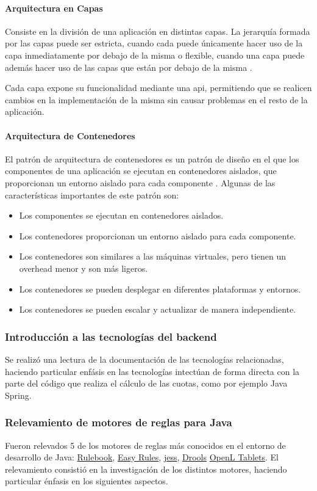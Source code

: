 \paragraph{Arquitectura en Capas}
Consiste en la división de una aplicación en distintas capas. La jerarquía formada por las capas puede ser estricta, cuando cada puede únicamente hacer uso de la capa inmediatamente por debajo de la misma o flexible, cuando una capa puede además hacer uso de las capas que están por debajo de la misma \cite{gommaModeling}.

Cada capa expone su funcionalidad mediante una \acrshort{api}, permitiendo que se realicen cambios en la implementación de la misma sin causar problemas en el resto de la aplicación.

\paragraph{Arquitectura de Contenedores}
El patrón de arquitectura de contenedores es un patrón de diseño en el que los componentes de una aplicación se ejecutan en contenedores aislados, que proporcionan un entorno aislado para cada componente \cite{dockerUpRunning}. Algunas de las características importantes de este patrón son:
\begin{itemize}
    \item Los componentes se ejecutan en contenedores aislados.
    \item Los contenedores proporcionan un entorno aislado para cada
componente.
    \item Los contenedores son similares a las máquinas virtuales, pero tienen
un overhead menor y son más ligeros.
    \item Los contenedores se pueden desplegar en diferentes plataformas y
entornos.
    \item Los contenedores se pueden escalar y actualizar de manera
independiente.
\end{itemize}

\subsubsection{Introducción a las tecnologías del backend}
Se realizó una lectura de la documentación de las tecnologías relacionadas, haciendo particular enfásis en las tecnologías intectúan de forma directa con la parte del código que realiza el cálculo de las cuotas, como por ejemplo Java Spring.

\subsubsection{Relevamiento de motores de reglas para Java}\label{para:motores}
Fueron relevados 5 de los motores de reglas más conocidos en el entorno de desarrollo de Java: \href{https://github.com/deliveredtechnologies/rulebook}{Rulebook}, \href{https://github.com/j-easy/easy-rules}{Easy Rules}, \href{http://alvarestech.com/temp/fuzzyjess/Jess60/Jess70b7/docs/index.html}{jess}, \href{https://www.drools.org/}{Drools} \href{https://openl-tablets.org/}{OpenL Tablets}. El relevamiento consistió en la investigación de los distintos motores, haciendo particular énfasis en los siguientes aspectos.

